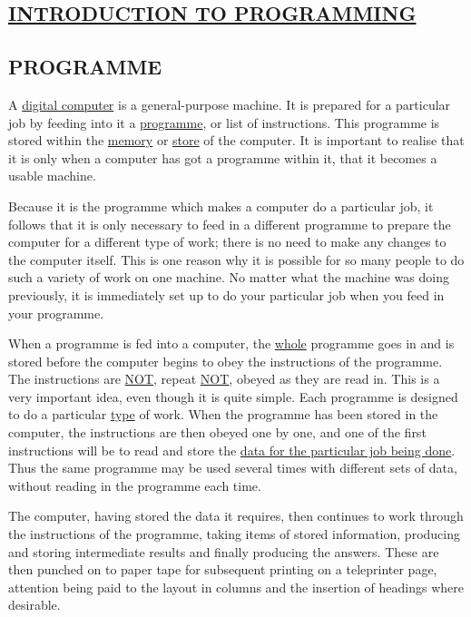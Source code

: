 \documentclass[10pt, a4paper, oneside]{article}
\newcommand{\myuline}[1]{\uline{#1}}
\begin{document}
\begin{multicols}{2}
\section{\myuline{INTRODUCTION TO PROGRAMMING}}

\subsection{PROGRAMME}

A \myuline{digital computer} is a general-purpose machine.
It is prepared for a particular job by feeding into
it a \myuline{programme}, or list of instructions.  This
programme is stored within the \myuline{memory} or \myuline{store} of the
computer.  It is important to realise that it is
only when a computer has got a programme within it,
that it becomes a usable machine.

Because it is the programme which makes a
computer do a particular job, it follows that it is
only necessary to feed in a different programme to
prepare the computer for a different type of work;
there is no need to make any changes to the computer
itself.  This is one reason why it is possible for so
many people to do such a variety of work on one
machine.  No matter what the machine was doing
previously, it is immediately set up to do your
particular job when you feed in your programme.

When a programme is fed into a computer, the
\myuline{whole} programme goes in and is stored before the
computer begins to obey the instructions of the
programme.  The instructions are \myuline{NOT}, repeat \myuline{NOT},
obeyed as they are read in.  This is a very important
idea, even though it is quite simple.  Each programme
is designed to do a particular \myuline{type} of work.  When the
programme has been stored in the computer, the instructions
are then obeyed one by one, and one of the first
instructions will be to read and store the \myuline{data for the
particular job being done}.  Thus the same programme may
be used several times with different sets of data,
without reading in the programme each time.

The computer, having stored the data it
requires, then continues to work through the
instructions of the programme, taking items of stored
information, producing and storing intermediate
results and finally producing the answers.  These are
then punched on to paper tape for subsequent printing
on a teleprinter page, attention being paid to the
layout in columns and the insertion of headings where
desirable.


\end{multicols}
\end{document}
